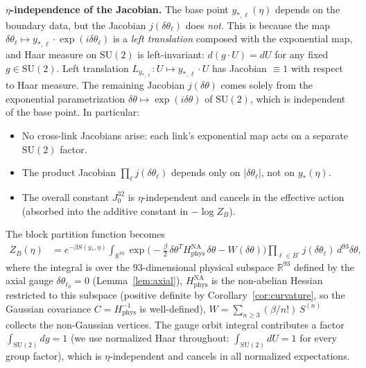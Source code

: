 \documentclass[11pt]{article}
\theoremstyle{definition}
\newcommand{\SU}{\mathrm{SU}}
\newcommand{\R}{\mathbb{R}}
\begin{document}
\textbf{$\eta$-independence of the Jacobian.}
The base point $y_{*,\ell}(\eta)$ depends on the boundary data,
but the Jacobian $j(\delta\theta_\ell)$ does \emph{not}.
This is because the map $\delta\theta_\ell\mapsto
y_{*,\ell}\cdot\exp(i\delta\theta_\ell)$ is a \emph{left
translation} composed with the exponential map, and Haar measure
on $\SU(2)$ is left-invariant:
$d(g\cdot U)=dU$ for any fixed $g\in\SU(2)$.
Left translation $L_{y_{*,\ell}}:U\mapsto y_{*,\ell}\cdot U$
has Jacobian $\equiv 1$ with respect to Haar measure.
The remaining Jacobian $j(\delta\theta)$ comes solely from
the exponential parametrization $\delta\theta\mapsto
\exp(i\delta\theta)$ of $\SU(2)$, which is independent of the
base point.  In particular:
\begin{itemize}[nosep]
\item No cross-link Jacobians arise: each link's exponential
map acts on a separate $\SU(2)$ factor.
\item The product Jacobian $\prod_\ell j(\delta\theta_\ell)$
depends only on $|\delta\theta_\ell|$, not on $y_*(\eta)$.
\item The overall constant $J_0^{32}$
is $\eta$-independent and cancels in the effective action (absorbed
into the additive constant in $-\log Z_B$).
\end{itemize}

The block partition function becomes
\begin{align}
Z_B(\eta)&=e^{-\beta S(y_*,\eta)}
\int_{\R^{93}}
\exp\bigl(-\tfrac{\beta}{2}\,\delta\theta^T H_{\mathrm{phys}}^{\mathrm{NA}}
\,\delta\theta-W(\delta\theta)\bigr)
\prod_{\ell\in B^\circ}j(\delta\theta_\ell)\,d^{93}\delta\theta,
\label{eq:Zfluct}
\end{align}
where the integral is over the $93$-dimensional physical subspace
$\R^{93}$ defined by the axial gauge $\delta\theta_{\ell_0}=0$
(Lemma~\ref{lem:axial}), $H_{\mathrm{phys}}^{\mathrm{NA}}$ is the
non-abelian Hessian restricted to this subspace (positive definite by
Corollary~\ref{cor:curvature}, so the Gaussian covariance
$C=H_{\mathrm{phys}}^{-1}$ is well-defined),
$W=\sum_{n\ge 3}(\beta/n!)\,S^{(n)}$ collects the
non-Gaussian vertices.  The gauge orbit integral contributes a factor
$\int_{\SU(2)}dg=1$ (we use normalized Haar throughout:
$\int_{\SU(2)}dU=1$ for every group factor), which is
$\eta$-independent and cancels in all normalized expectations.
\end{document}
